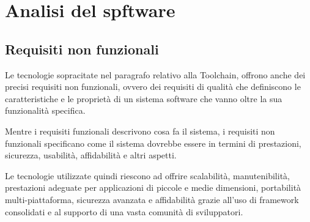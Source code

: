 \section{Analisi del spftware}
\subsection{Requisiti non funzionali}
Le tecnologie sopracitate nel paragrafo relativo alla Toolchain, offrono anche dei precisi
requisiti non funzionali, ovvero dei requisiti di qualità che definiscono le caratteristiche 
e le proprietà di un sistema software che vanno oltre la sua funzionalità specifica. 

Mentre i requisiti funzionali descrivono cosa fa il sistema, i requisiti non funzionali specificano come 
il sistema dovrebbe essere in termini di prestazioni, sicurezza, usabilità, affidabilità e altri aspetti.

Le tecnologie utilizzate quindi riescono ad offrire scalabilità, manutenibilità, prestazioni adeguate per 
applicazioni di piccole e medie dimensioni, portabilità multi-piattaforma, sicurezza avanzata e affidabilità 
grazie all'uso di framework consolidati e al supporto di una vasta comunità di sviluppatori.

